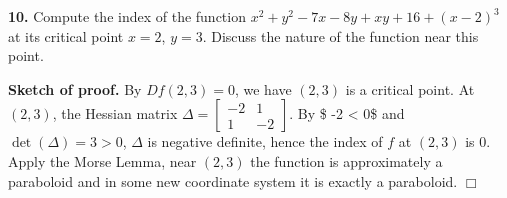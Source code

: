 \documentclass{article}
\begin{document}
    \textbf{10.} Compute the index of the function
$x^2 + y^2 − 7x − 8y + xy + 16 + (x − 2)^3$ at its critical point
$x = 2$, $y = 3$. Discuss the nature of the function near this point.

    \textbf{Sketch of proof.} By $Df(2,3) = 0$, we have $(2,3)$ is a
critical point. At $(2,3)$, the Hessian matrix
$\Delta = \begin{bmatrix}-2 & 1 \\ 1 & -2 \end{bmatrix}$. By \$ -2
\textless{} 0\$ and $\det (\Delta) = 3 > 0$, $\Delta$ is negative
definite, hence the index of $f$ at $(2,3)$ is $0$. Apply the Morse
Lemma, near $(2,3)$ the function is approximately a paraboloid and in
some new coordinate system it is exactly a paraboloid. $\Box$


    
    
    
    
\end{document}
